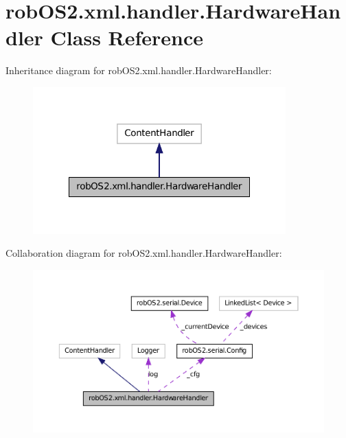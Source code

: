 \hypertarget{classrob_o_s2_1_1xml_1_1handler_1_1_hardware_handler}{
\section{robOS2.xml.handler.HardwareHandler Class Reference}
\label{classrob_o_s2_1_1xml_1_1handler_1_1_hardware_handler}
}


Inheritance diagram for robOS2.xml.handler.HardwareHandler:\nopagebreak
\begin{figure}[H]
\begin{center}
\leavevmode
\includegraphics[width=276pt]{classrob_o_s2_1_1xml_1_1handler_1_1_hardware_handler__inherit__graph}
\end{center}
\end{figure}


Collaboration diagram for robOS2.xml.handler.HardwareHandler:\nopagebreak
\begin{figure}[H]
\begin{center}
\leavevmode
\includegraphics[width=400pt]{classrob_o_s2_1_1xml_1_1handler_1_1_hardware_handler__coll__graph}
\end{center}
\end{figure}
